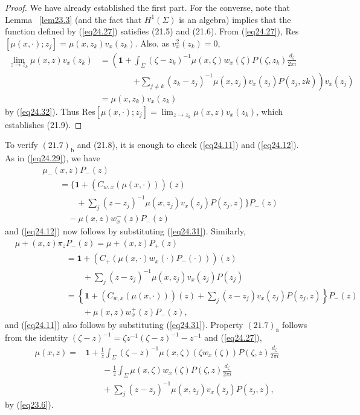 \documentclass{surv-l}
\theoremstyle{plain}
\theoremstyle{definition}
\numberwithin{equation}{chapter}
\begin{document}
\begin{proof}
We have already established the first part. For the converse, note that Lemma ~\ref{lem23.3} (and the fact that $H^{1}(\Sigma)$ is an algebra) implies that the function defined by (\ref{eq24.27}) satisfies (21.5) and (21.6). From (\ref{eq24.27}), Res$[\mu(x,\cdot);z_{j}]= \mu(x, z_{k})v_{x}(z_{k})$. Also, as $v_{x}^{2}(z_{k})=0$,
\begin{align*}
\lim_{z\rightarrow z_{k}}\mu(x, z)v_{x}(z_{k}) & = \left(\mathbf{1}+\int_{\Sigma}(\zeta-z_{k})^{-1}\mu(x, \zeta)w_{x}(\zeta)P(\zeta, z_{k})\frac{d_{\zeta}}{2\pi i}\right.\\
&\qquad \qquad \left. +\sum_{j\neq k}(z_{k}-z_{j})^{-1}\mu(x,z_{j})v_{x}(z_{j})P(z_{j},z{k})\right)v_{x}(z_{j})\\
& =\mu(x,z_{k})v_{x}(z_{k})
\end{align*}
by (\ref{eq24.32}). Thus Res$[\mu(x, \cdot);z_{j}]=\lim_{z\rightarrow z_{k}}\mu(x,z)v_{x}(z_{k})$, which establishes (21.9).
\end{proof}
To verify $(21.7)_{\mathrm{b}}$ and (21.8), it is enough to check (\ref{eq24.11}) and (\ref{eq24.12}). As in (\ref{eq24.29}), we have
\begin{align*}
& \mu_{-}(x,z)P_{-}(z)\\
&\qquad =\Big\{\mathbf{1}+(C_{w,x}(\mu(x,\cdot)))(z)\\
&\qquad \qquad   +\sum_{j}(z-z_{j})^{-1}\mu(x,z_{j})v_{x}(z_{j})P(z_{j},z) \Big\} P_{-}(z)\\
&\qquad \quad  -\mu(x, z)w_{x}^{-}(z)P_{-}(z)
\end{align*}
and (\ref{eq24.12}) now follows by substituting (\ref{eq24.31}). Similarly,
\begin{align*}
&\mu+(x, z)\pi_{z}P_{-}(z) =\mu+(x,z)P_{+}(z)\\
&\qquad\qquad\qquad =\mathbf{1}+(C_{+}(\mu(x, \cdot)w_{x}(\cdot)P_{-}(\cdot)))(z)\\
&\qquad\qquad\qquad\qquad +\sum_{j}(z-z_{j})^{-1}\mu(x, z_{j})v_{x}(z_{j})P(z_{j})\\
&\qquad\qquad\qquad =\left\{\mathbf{1}+(C_{w,x}(\mu(x, \cdot)))(z)+\sum_{j}(z-z_{j})v_{x}(z_{j})P(z_{j}, z)\right\}P_{-}(z)\\
&\qquad\qquad\qquad\qquad +\mu(x,z)w_{x}^{+}(z)P_{-}(z),
\end{align*}
and (\ref{eq24.11}) also follows by substituting (\ref{eq24.31}).
Property $(21.7)_{\mathrm{a}}$ follows from the identity $(\zeta-z)^{-1}=\zeta
z^{-1}(\zeta-z)^{-1}-z^{-1}$ and (\ref{eq24.27}),
\begin{align*}
\mu(x, z) =&\mathbf{1}+\frac{1}{z}\int_{\Sigma}(\zeta-z)^{-1}\mu(x, \zeta)(\zeta w_{x}(\zeta))P(\zeta, z)\frac{d_{\zeta}}{2\pi i}\\
&\qquad  -\frac{1}{z}\int_{\Sigma}\mu(x,\zeta)w_{x}(\zeta)P(\zeta,z)\frac{d_{\zeta}}{2\pi i}\\
&\qquad  +\sum_{j}(z-z_{j})^{-1}\mu(x, z_{j})v_{x}(z_{j})P(z_{j}, z),
\end{align*}
by (\ref{eq23.6}).
\end{document}
